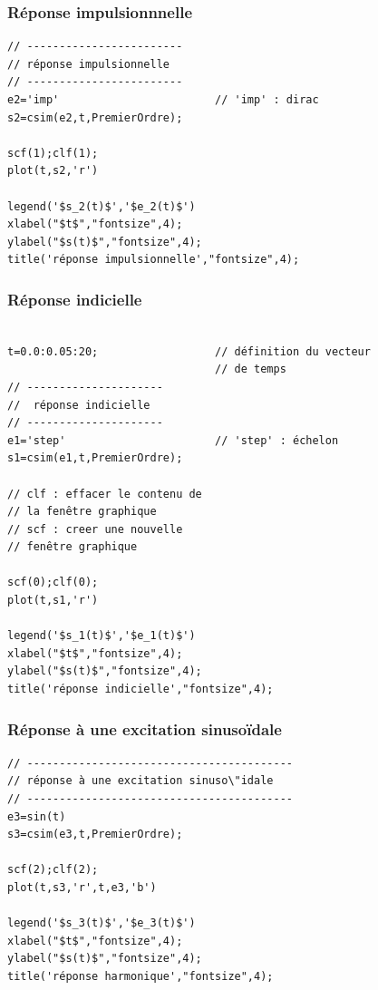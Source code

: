 \subsubsection{Réponse impulsionnnelle}
\begin{code}
\begin{verbatim}
// ------------------------
// réponse impulsionnelle
// ------------------------
e2='imp'                        // 'imp' : dirac
s2=csim(e2,t,PremierOrdre);   

scf(1);clf(1);
plot(t,s2,'r')

legend('$s_2(t)$','$e_2(t)$')
xlabel("$t$","fontsize",4);
ylabel("$s(t)$","fontsize",4); 
title('réponse impulsionnelle',"fontsize",4);
\end{verbatim}
\end{code}

\subsubsection{Réponse indicielle}
\begin{code}
\begin{verbatim}

t=0.0:0.05:20;                  // définition du vecteur 
                                // de temps
// ---------------------
//  réponse indicielle
// ---------------------
e1='step'                       // 'step' : échelon
s1=csim(e1,t,PremierOrdre);    

// clf : effacer le contenu de
// la fenêtre graphique
// scf : creer une nouvelle 
// fenêtre graphique

scf(0);clf(0);
plot(t,s1,'r')

legend('$s_1(t)$','$e_1(t)$')
xlabel("$t$","fontsize",4);
ylabel("$s(t)$","fontsize",4); 
title('réponse indicielle',"fontsize",4);
\end{verbatim}
\end{code}


\subsubsection{Réponse à une excitation sinuso\"idale}
\begin{code}
\begin{verbatim}
// -----------------------------------------
// réponse à une excitation sinuso\"idale 
// -----------------------------------------
e3=sin(t)
s3=csim(e3,t,PremierOrdre);

scf(2);clf(2);
plot(t,s3,'r',t,e3,'b')

legend('$s_3(t)$','$e_3(t)$')
xlabel("$t$","fontsize",4);
ylabel("$s(t)$","fontsize",4); 
title('réponse harmonique',"fontsize",4);
\end{verbatim}
\end{code}

